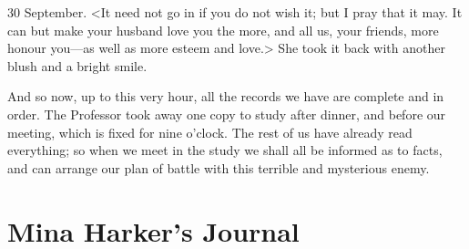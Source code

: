 \begin{diary}{30 September.}
<It need not go in if you do not wish it; but I pray that it may. It can but make your husband love you the more, and all us, your friends, more honour you—as well as more esteem and love.> She took it back with another blush and a bright smile.

And so now, up to this very hour, all the records we have are complete and in order. The Professor took away one copy to study after dinner, and before our meeting, which is fixed for nine o'clock. The rest of us have already read everything; so when we meet in the study we shall all be informed as to facts, and can arrange our plan of battle with this terrible and mysterious enemy.
\end{diary}

\section{Mina Harker's Journal}

